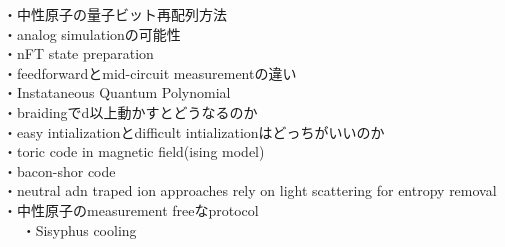\documentclass[a4paper,10.5pt]{ltjsarticle}
\begin{document}
・中性原子の量子ビット再配列方法\\
・analog simulationの可能性\\
・nFT state preparation\\
・feedforwardとmid-circuit measurementの違い\\
・Instataneous Quantum Polynomial\\
・braidingでd以上動かすとどうなるのか\\
・easy intializationとdifficult intializationはどっちがいいのか\\
・toric code in magnetic field(ising model)\\
・bacon-shor code\\
・neutral adn traped ion approaches rely on light scattering for entropy removal\\
・中性原子のmeasurement freeなprotocol\\　
・Sisyphus cooling\\
\\
\end{document}
